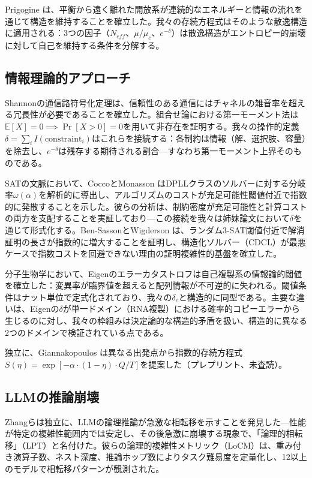 \documentclass[11pt,a4paper]{article}
\begin{document}
Prigogine \cite{prigogine1984}は、平衡から遠く離れた開放系が連続的なエネルギーと情報の流れを通じて構造を維持することを確立した。我々の存続方程式はそのような散逸構造に適用される：3つの因子（$N_{eff}$、$\mu/\mu_c$、$e^{-\delta}$）は散逸構造がエントロピー的崩壊に対して自己を維持する条件を分解する。

\subsection{情報理論的アプローチ}

Shannonの通信路符号化定理\cite{shannon1948,cover2006}は、信頼性のある通信にはチャネルの雑音率を超える冗長性が必要であることを確立した。組合せ論における第一モーメント法\cite{alon2016}は$\mathbb{E}[X] = 0 \implies \Pr[X > 0] = 0$を用いて非存在を証明する。我々の操作的定義$\delta = \sum_i I(\text{constraint}_i)$はこれらを接続する：各制約は情報（解、選択肢、容量）を除去し、$e^{-\delta}$は残存する期待される割合---すなわち第一モーメント上界そのものである。

SATの文脈において、CoccoとMonasson \cite{cocco2001}はDPLLクラスのソルバーに対する分岐率$\omega(\alpha)$を解析的に導出し、アルゴリズムのコストが充足可能性閾値付近で指数的に発散することを示した。彼らの分析は、制約密度が充足可能性と計算コストの両方を支配することを実証しており---この接続を我々は姉妹論文\cite{sunagawa2026sat}において$\delta$を通じて形式化する。Ben-SassonとWigderson \cite{bensasson2001}は、ランダム3-SAT閾値付近で解消証明の長さが指数的に増大することを証明し、構造化ソルバー（CDCL）が最悪ケースで指数コストを回避できない理由の証明複雑性的基盤を確立した。

分子生物学において、Eigenのエラーカタストロフ\cite{eigen1971}は自己複製系の情報論的閾値を確立した：変異率が臨界値を超えると配列情報が不可逆的に失われる。閾値条件はナット単位で定式化されており、我々の$\delta_c$と構造的に同型である。主要な違いは、Eigenの$\delta$が単一ドメイン（RNA複製）における確率的コピーエラーから生じるのに対し、我々の枠組みは決定論的な構造的矛盾を扱い、構造的に異なる2つのドメインで検証されている点である。

独立に、Giannakopoulos \cite{giannakopoulos2025}は異なる出発点から指数的存続方程式$S(\eta) = \exp[-\alpha \cdot (1-\eta) \cdot Q/T]$を提案した（プレプリント、未査読）。

\subsection{LLMの推論崩壊}

Zhangら\cite{zhang2026lpt}は独立に、LLMの論理推論が急激な相転移を示すことを発見した---性能が特定の複雑性範囲内では安定し、その後急激に崩壊する現象で、「論理的相転移」（LPT）と名付けた。彼らの論理的複雑性メトリック（LoCM）は、重み付き演算子数、ネスト深度、推論ホップ数によりタスク難易度を定量化し、12以上のモデルで相転移パターンが観測された。
\end{document}
